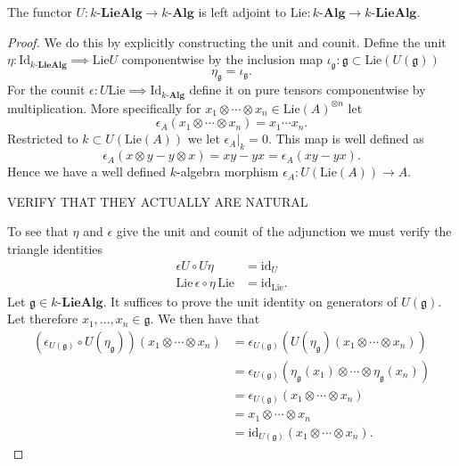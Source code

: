 \begin{proposition}
  \label{prop:adjointu}
  The functor $  U:k\text{-}\mathbf{LieAlg} \to k\text{-}\mathbf{Alg}  $ is left adjoint to $ \text{Lie}:k\text{-}\mathbf{Alg} \to k\text{-}\mathbf{LieAlg} $.
\end{proposition}
\begin{proof}
  We do this by explicitly constructing the unit and counit. Define the unit $ \eta: \text{Id}_{k\text{-}\mathbf{LieAlg}} \implies \text{Lie}U $ componentwise by the inclusion map $ \iota_\mathfrak{g}: \mathfrak{g} \subset \text{Lie}(U(\mathfrak{g})) $
  \begin{equation}
    \eta_\mathfrak{g} = \iota_\mathfrak{g}
  .\end{equation}
  For the counit $ \epsilon: U\text{Lie} \implies  \text{Id}_{k\text{-}\mathbf{Alg}} $ define it on pure tensors componentwise by multiplication. More specifically
  for $ x_1 \otimes \cdots \otimes x_n \in \text{Lie}(A)^{\otimes n} $ let
  \begin{equation}
    \epsilon_A(x_1 \otimes \cdots \otimes x_n) = x_1\cdots x_n.
  \end{equation}
  Restricted to $ k \subset U(\text{Lie}(A)) $ we let $ \epsilon_A |_k = 0 $. This map is well defined as
  \begin{equation*}
  \epsilon_A(x\otimes y - y \otimes x) = xy - yx = \epsilon_A(xy - yx)
  .\end{equation*}
  Hence we have a well defined $ k $-algebra morphism $ \epsilon_A: U(\text{Lie}(A)) \to A $.

  VERIFY THAT THEY ACTUALLY ARE NATURAL

  To see that $ \eta $ and $ \epsilon $ give the unit and counit of the adjunction we must verify the triangle identities
  \begin{align}
    \epsilon U \circ U \eta &= \text{id}_U \\
    \text{Lie}\,\epsilon \circ \eta\,\text{Lie} &= \text{id}_\text{Lie}
  .\end{align}
  Let $ \mathfrak{g} \in k\text{-}\mathbf{LieAlg} $. It suffices to prove the unit identity on generators of $ U(\mathfrak{g}) $. Let therefore $ x_1, \ldots, x_n \in \mathfrak{g} $. We then have that
  \begin{align*}
    (\epsilon_{U(\mathfrak{g})} \circ U(\eta_{\mathfrak{g}}))(x_1 \otimes \cdots \otimes x_n) &= \epsilon_{U(\mathfrak{g})}(U(\eta_{\mathfrak{g}})(x_1 \otimes \cdots \otimes x_n)) \\
                                                                  &= \epsilon_{U(\mathfrak{g})}(\eta_\mathfrak{g}(x_1) \otimes \cdots \otimes \eta_\mathfrak{g}(x_n)) \\
                                                                  &= \epsilon_{U(\mathfrak{g})}(x_1 \otimes \cdots \otimes x_n) \\
                                                                  &= x_1 \otimes \cdots \otimes x_n \\
                                                                  &= \text{id}_{U(\mathfrak{g})}(x_1 \otimes \cdots \otimes x_n)
  .\end{align*}


\end{proof}
